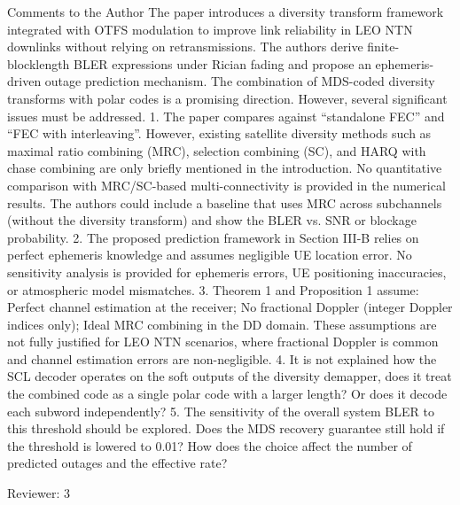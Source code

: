 Comments to the Author
The paper introduces a diversity transform framework integrated with OTFS modulation to improve link reliability in LEO NTN downlinks without relying on retransmissions. The authors derive finite-blocklength BLER expressions under Rician fading and propose an ephemeris-driven outage prediction mechanism. The combination of MDS-coded diversity transforms with polar codes is a promising direction. However, several significant issues must be addressed.
1. The paper compares against “standalone FEC” and “FEC with interleaving”. However, existing satellite diversity methods such as maximal ratio combining (MRC), selection combining (SC), and HARQ with chase combining are only briefly mentioned in the introduction. No quantitative comparison with MRC/SC-based multi-connectivity is provided in the numerical results. The authors could include a baseline that uses MRC across subchannels (without the diversity transform) and show the BLER vs. SNR or blockage probability.
2. The proposed prediction framework in Section III-B relies on perfect ephemeris knowledge and assumes negligible UE location error. No sensitivity analysis is provided for ephemeris errors, UE positioning inaccuracies, or atmospheric model mismatches.
3. Theorem 1 and Proposition 1 assume: Perfect channel estimation at the receiver; No fractional Doppler (integer Doppler indices only); Ideal MRC combining in the DD domain. These assumptions are not fully justified for LEO NTN scenarios, where fractional Doppler is common and channel estimation errors are non-negligible.
4. It is not explained how the SCL decoder operates on the soft outputs of the diversity demapper, does it treat the combined code as a single polar code with a larger length? Or does it decode each subword independently?
5. The sensitivity of the overall system BLER to this threshold should be explored. Does the MDS recovery guarantee still hold if the threshold is lowered to 0.01? How does the choice affect the number of predicted outages and the effective rate?


Reviewer: 3

